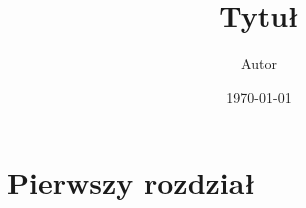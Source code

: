 


\title{Tytuł}
\author{Autor}
\date{\today}




\maketitle
{
\setcounter{tocdepth}{3}
\tableofcontents
\newpage
{} 
}

\section{Pierwszy rozdział}


% 
% 

